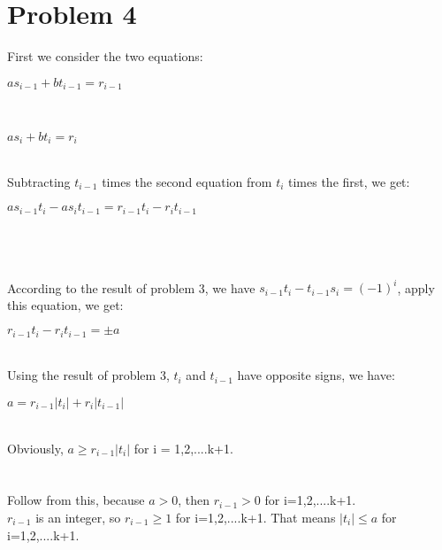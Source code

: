 \documentclass{article}
\begin{document}
\section{Problem 4}
First we consider the two equations:\\
\centerline{$as_{i-1} + bt_{i-1} = r_{i-1}$}\\
\centerline{$as_i + bt_i = r_i$}\\
Subtracting $t_{i-1}$ times the second equation from $t_i$ times the first, we get:\\
\centerline{$ as_{i-1}t_i - as_it_{i-1} = r_{i-1}t_i - r_it_{i-1}$}\\
\\ \hspace*{\fill} \\
According to the result of problem 3, we have $s_{i-1}t_i - t_{i-1}s_i = (-1)^i$, apply this equation, we get:\\
\centerline{$r_{i-1}t_i - r_it_{i-1} = \pm a$}\\
Using the result of problem 3, $t_i$ and $t_{i-1}$ have opposite signs, we have: \\
\centerline{$ a = r_{i-1}|t_i| + r_i|t_{i-1}|$}\\
Obviously, $a \geq r_{i-1}|t_i|$ for i = 1,2,....k+1.\\
\\ \hspace*{\fill} \\
Follow from this, because $ a > 0$, then $r_{i-1} > 0$ for i=1,2,....k+1.\\ 
$r_{i-1}$ is an integer, so $r_{i-1} \geq 1$ for i=1,2,....k+1. That means $|t_i| \leq a$ for i=1,2,....k+1.\\
\\ \hspace*{\fill} \\
\end{document}
